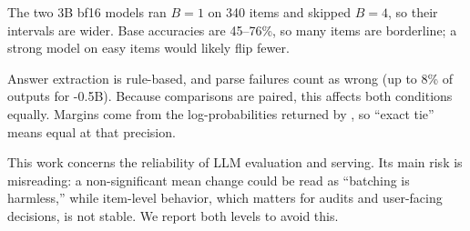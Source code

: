  The two 3B bf16 models ran $B=1$ on 340 items and skipped $B=4$, so their intervals are wider. Base accuracies are 45--76\%, so many items are borderline; a strong model on easy items would likely flip fewer.

 Answer extraction is rule-based, and parse failures count as wrong (up to 8\% of \mmlucot outputs for \qwen-0.5B). Because comparisons are paired, this affects both conditions equally. Margins come from the log-probabilities returned by \vllm, so ``exact tie'' means equal at that precision.

 This work concerns the reliability of LLM evaluation and serving. Its main risk is misreading: a non-significant mean change could be read as ``batching is harmless,'' while item-level behavior, which matters for audits and user-facing decisions, is not stable. We report both levels to avoid this.
